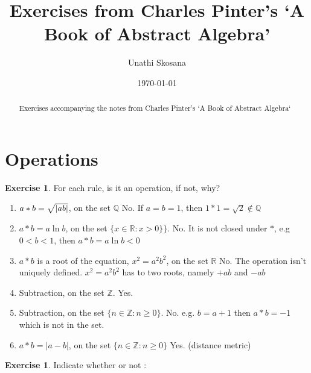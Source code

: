 \documentclass[nohyper,nobib]{tufte-handout}
\title{Exercises from  Charles Pinter's `A Book of Abstract Algebra'} %
\author{Unathi Skosana}
\date{\vspace{-5pt}\normalsize \today} %
\theoremstyle{definition}
\newtheorem{exer}[thm]{Exercise}
\theoremstyle{remark}
\begin{document}
\justifying 
\maketitle

\begin{abstract}
\noindent
Exercises accompanying the notes from Charles Pinter's `A Book of Abstract Algebra`
\end{abstract}

\tableofcontents

\section{Operations}

\begin{exer}
    For each rule, is it an operation, if not, why?
\end{exer}

\begin{enumerate}
    \item $a * b  = \sqrt{\abs{a b}}$, on the set $\mathbb{Q}$ 
        \newline
        No. If $a = b = 1$, then $1 * 1 = \sqrt{2} \not\in \mathbb{Q}$
    \item $a * b  = a\ln{b}$, on the set $\{ x \in \mathbb{R}: x > 0\} \}$.
        \newline
        No. It is not closed under $*$, e.g $0 < b < 1$, then $a * b  = a\ln{b} < 0$
    \item $a * b$ is a root of the equation, $x^2 = a^2b^2$, on the set $\mathbb{R}$
        \newline
        No. The operation isn't uniquely defined. $x^2 = a^2b^2$ has to two roots, namely $+ab$ and $-ab$
    \item Subtraction, on the set $\mathbb{Z}$. 
        \newline
        Yes. 
    \item Subtraction, on the set $\{ n \in \mathbb{Z}: n \geq 0 \}$.
        \newline
        No. e.g. $b = a + 1$ then $a * b = -1$ which is not in the set.
    \item $a * b = |a - b|$, on the set $\{ n \in \mathbb{Z}: n \geq 0\}$
        \newline
        Yes. (distance metric)
\end{enumerate}

\noindent
\begin{exer}
    Indicate whether or not :
\end{exer}
\end{document}
